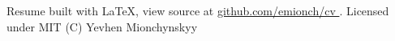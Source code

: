 \documentclass[]{resume-format}
\begin{document}

\vspace{0.5mm}
\begin{cvskills}
\end{cvskills}





\vspace{5mm}
\begin{center}
    \tiny\color{lightgray}
    Resume built with LaTeX, view source at
    \href{https://github.com/emionch/cv}{ github.com/emionch/cv }.
    Licensed under MIT (C)
    Yevhen Mionchynskyy {\the\year}
\end{center}
\ 
\end{document}
